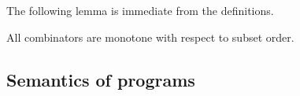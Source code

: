 The following lemma is immediate from the definitions.
\begin{lemma}
  \label{lem:monotone}
  All combinators are monotone with respect to subset order.  
\end{lemma}

\subsection{Semantics of programs}
\label{sec:semantics}


\begin{comment}
\footnote{We only consider executions where register state is empty in
  forked threads.  Given item~\ref{pre-acquire} of
  Definition~\ref{def:prefix}, a sufficient condition is that parallel
  composition is always preceded by an acquire fence, as in programs of the
  form:
  \begin{displaymath}
    \VAR\vec{\aLoc}\SEMI
    \vec{\aLoc}\GETS\vec{0}\SEMI
    \vec{\bLoc}\GETS\vec{0}\SEMI
    \FENCE\SEMI
    (\aCmd^1 \PAR \cdots \PAR \aCmd^n)
  \end{displaymath}
  where $\aCmd^1$, \ldots, $\aCmd^n$ do not include $\PAR$.  To avoid clutter
  in drawings, we often drop the explicit fence.}.
\end{comment}


